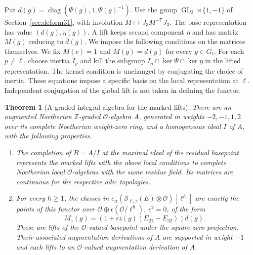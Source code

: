 \documentclass[a4paper,11pt]{article}
\newtheorem{theorem}[proposition]{Theorem}
\theoremstyle{definition}
\theoremstyle{remark}
\newcommand{\ZZ}{\mathbb Z}\newcommand{\ord}{\operatorname{ord}}
\numberwithin{equation}{section}
\newcommand{\Sel}{\mathcal S}
\newcommand{\GL}{\operatorname{GL}}
\newcommand{\OO}{\mathcal O}
\begin{document}
Put \(d(g)=\operatorname{diag}(\Psi(g),1,\Psi(g)^{-1})\). Use the group \(\GL_3\rtimes\{1,-1\}\) of Section~\ref{sec:deform31}, with involution \(M\mapsto J_3 M^{-\mathsf T} J_3\). The base representation has value \((d(g),\eta(g))\). A lift keeps second component \(\eta\) and has matrix \(M(g)\) reducing to \(\overline d(g)\). We impose the following conditions on the matrices themselves. We fix \(M(c)=1\) and \(M(g)=d(g)\) for every \(g\in G_\ell\). For each \(p\ne\ell\), choose inertia \(I_p\) and kill the subgroup \(I_p\cap\ker\Psi\cap\ker\eta\) in the lifted representation. The kernel condition is unchanged by conjugating the choice of inertia. These equations impose a specific basis on the local representation at \(\ell\). Independent conjugation of the global lift is not taken in defining the functor.

\begin{theorem}[A graded integral algebra for the marked lifts]\label{thm:ring39}
There are an augmented Noetherian \(\ZZ\)-graded \(\OO\)-algebra \(A\), generated in weights \(-2,-1,1,2\) over its complete Noetherian weight-zero ring, and a homogeneous ideal \(I\) of \(A\), with the following properties.
\begin{enumerate}\setlength{\itemsep}{1pt}
\item The completion of \(B=A/I\) at the maximal ideal of the residual basepoint represents the marked lifts with the above local conditions to complete Noetherian local \(\OO\)-algebras with the same residue field. Its matrices are continuous for the respective adic topologies.
\item For every \(h\ge1\), the classes in \(e_\alpha(\Sel_{\ell,r}(E)\otimes\OO)[\ell^h]\) are exactly the points of this functor over \(\OO\oplus\epsilon(\OO/\ell^h)\), \(\epsilon^2=0\), of the form
\[
               M_z(g)=(1+\epsilon z(g)(E_{21}-E_{32}))d(g).
\]
These are lifts of the \(\OO\)-valued basepoint under the square-zero projection. Their associated augmentation derivations of \(A\) are supported in weight \(-1\) and each lifts to an \(\OO\)-valued augmentation derivation of \(A\).
\end{enumerate}
\end{theorem}
\end{document}
